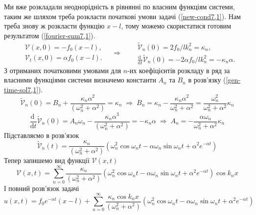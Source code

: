 Ми вже розкладали неоднорідність в рівнянні по власним функціям системи, таким же шляхом треба розкласти початкові умови задачі (\ref{new-cond7,1}). Нам треба знову ж розкласти функцію $x - l$, тому можемо скористатися готовим результатом (\ref{fourier-sum7,1}).
\begin{equation}
    \begin{aligned} %
        &\mathcal{V}(x,0) = - f_0 (x-l),\\
        &\mathcal{V}_t(x,0) = \alpha f_0 (x-l).
    \end{aligned} 
    \quad\Rightarrow\quad
    \begin{aligned} %
        &\widetilde{\mathcal{V}}_n(0) = 2 f_0/l k_n^2 = \kappa_n,\\
        &\frac{\mathrm{d}\;}{\mathrm{d}t}\widetilde{\mathcal{V}}_n(0) = -2\alpha f_0/lk_n^2 = -\kappa_n\alpha.
    \end{aligned} 
\end{equation}
З отриманих початковими умовами для $n$-их коефіцієнтів розкладу в ряд за власними функціями системи визначемо константи $A_n$ та $B_n$ в розв'язку (\ref{gen-time-sol7,1}). 
\begin{equation*}
    \widetilde{\mathcal{V}}_n(0) = B_n + \frac{\kappa_n\alpha^2}{(\omega_n^2 + \alpha^2)} = \kappa_n
    \;\Rightarrow\;
    B_n  = \kappa_n - \frac{\kappa_n\alpha^2}{\omega_n^2 + \alpha^2} = \frac{\omega_n^2}{\omega_n^2 + \alpha^2} \kappa_n
\end{equation*}
\begin{equation*}
    \frac{\mathrm{d}\;}{\mathrm{d}t}\widetilde{\mathcal{V}}_n(0) = A_n\omega_n - \frac{\kappa_n\alpha^3}{(\omega_n^2 + \alpha^2)} = -\kappa_n\alpha
    \;\Rightarrow\;
    A_n = -\frac{\alpha\omega_n}{\omega_n^2 + \alpha^2} \kappa_n
\end{equation*}
Підставляємо в розв'язок
\begin{equation} \label{unic-time-sol7,1}
    \widetilde{\mathcal{V}}_n(t) = \frac{\kappa_n}{(\omega_n^2 + \alpha^2)} \left(\omega_n^2\cos\omega_nt - \alpha\omega_n\sin\omega_nt +  \alpha^2e^{-\alpha t}\right)
\end{equation}  
Тепер запишемо вид функції $\mathcal{V}(x,t)$
\begin{equation}
    \mathcal{V}(x,t) = \sum_{n=0}^\infty \frac{\kappa_n}{(\omega_n^2 + \alpha^2)} \left(\omega_n^2\cos\omega_nt - \alpha\omega_n\sin\omega_nt +  \alpha^2e^{-\alpha t}\right) \cos k_n x
\end{equation}
І повний розв'язок задачі
\begin{equation} \label{Cauchy-sol7,1}
    u(x,t) = f_0 e^{-\alpha t} (x - l) +  \sum_{n=0}^\infty \frac{\kappa_n \cos k_n x}{(\omega_n^2 + \alpha^2)} \left(\omega_n^2\cos\omega_nt - \alpha\omega_n\sin\omega_nt +  \alpha^2e^{-\alpha t}\right) 
\end{equation}

%